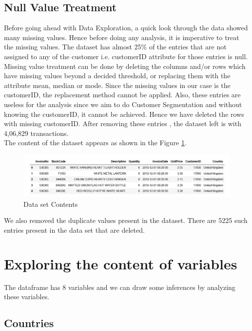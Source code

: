 \subsection{Null Value Treatment}
Before going ahead with Data Exploration, a quick look through the data showed many missing values. Hence before doing any analysis, it is imperative to treat the missing values. The dataset has almost 25\% of the entries that are not assigned to any of the customer i.e. customerID attribute for those entries is null. \\
Missing value treatment can be done by deleting the columns and/or rows which have missing values beyond a decided threshold, or replacing them with the attribute mean, median or mode. 
Since the missing values in our case is the customerID, the replacement method cannot be applied. Also, these entries are useless for the analysis since we aim to do Customer Segmentation and without knowing the customerID, it cannot be achieved. Hence we have deleted the rows with missing customerID. After removing these entries , the dataset left is with 4,06,829 transactions.\\

The content of the dataset appears as shown in the Figure \ref{data}.

\begin{figure}
\caption{Data set Contents}
\label{data}
\centering
\includegraphics[width=\columnwidth]{images/DatasetContent.PNG}
\end{figure}

We also removed the duplicate values present in the dataset. There are 5225 such entries present in the data set that are deleted.\\

\section{Exploring the content of variables}

The dataframe has 8 variables and we can draw some inferences by analyzing these variables.

\subsection{Countries}

